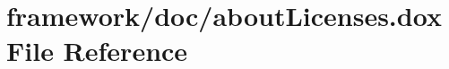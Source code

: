 \hypertarget{about_licenses_8dox}{}\section{framework/doc/about\+Licenses.dox File Reference}
\label{about_licenses_8dox}
